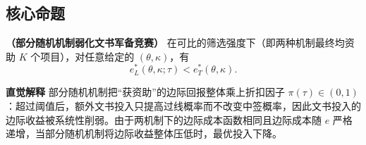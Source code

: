 \subsection{\textbf{核心命题}}

\begin{proposition}
\textbf{（部分随机机制弱化文书军备竞赛）} \quad
在可比的筛选强度下（即两种机制最终均资助 $K$ 个项目），对任意给定的 $(\theta,\kappa)$，有
$$e_L^*(\theta,\kappa;\tau) < e_T^*(\theta,\kappa).$$
\end{proposition}
\noindent\textbf{直觉解释} \quad 
部分随机机制把“获资助”的边际回报整体乘上折扣因子 $\pi(\tau)\in(0,1)$：超过阈值后，额外文书投入只提高过线概率而不改变中签概率，因此文书投入的边际收益被系统性削弱。由于两机制下的边际成本函数相同且边际成本随 $e$ 严格递增，当部分随机机制将边际收益整体压低时，最优投入下降。


